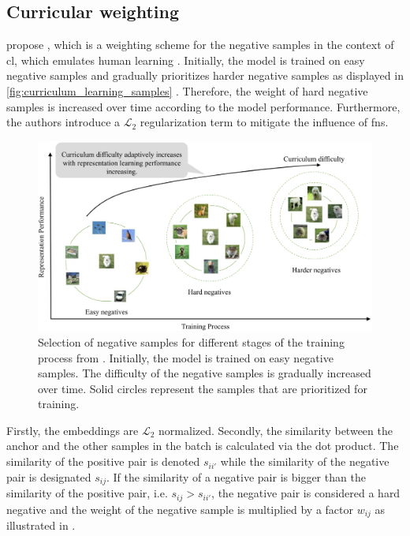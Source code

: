 \subsection{Curricular weighting}\label{subsec:curricular_weighting}


\citet{curricular_weighting_2024} propose \curricularWeighting, 
which is a weighting scheme for the negative samples 
in the context of \ac{cl}, which emulates human learning \citet{curricular_weighting_2024,curriculum_wang_2022,curriculum_HGNNs_2024}.
Initially, the model is trained on easy negative samples and gradually prioritizes harder negative samples 
as displayed in \autoref{fig:curriculum_learning_samples} \citet{curricular_weighting_2024,curriculum_Soviany_2022}.
Therefore, the weight of hard negative samples is increased over time according to the model performance.
Furthermore, the authors introduce a $\mathcal{L}_2$ regularization term to mitigate the influence of \acp{fn}.

\begin{figure}[!htb] %
    \centering
    \includegraphics[width=360pt]{images/curriculum_learning_samples.png}
    \caption{Selection of negative samples for different stages of the training process 
    from \citet{curricular_weighting_2024}.
    Initially, the model is trained on easy negative samples.
    The difficulty of the negative samples is gradually increased over time.
    Solid circles represent the samples that are prioritized for training.
    }
    \label{fig:curriculum_learning_samples}
\end{figure}

Firstly, the embeddings are $\mathcal{L}_2$ normalized.
Secondly, the similarity between the anchor and the other samples in the batch is calculated via the dot product.
The similarity of the positive pair is denoted $s_{ii'}$ while the similarity of the negative pair is designated $s_{ij}$.
If the similarity of a negative pair is bigger than the similarity of the positive pair, 
i.e. $s_{ij} > s_{ii'}$, the negative pair is considered a hard negative and 
the weight of the negative sample is multiplied by a factor $w_{ij}$ 
as illustrated in .

